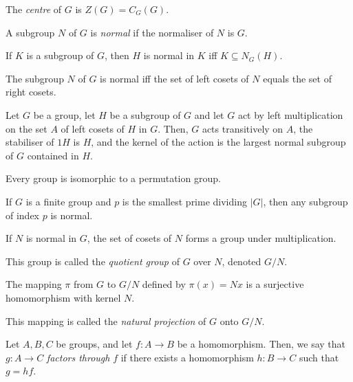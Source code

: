 \begin{defn}
    The \emph{centre} of $G$ is $Z(G)=C_G(G)$.
\end{defn}
\begin{defn}
    A subgroup $N$ of $G$ is \emph{normal} if the normaliser of $N$ is $G$.
\end{defn}
\begin{prop}
    If $K$ is a subgroup of $G$, then $H$ is normal in $K$ iff $K\subseteq
    N_G(H)$.
\end{prop}
\begin{prop}
    The subgroup $N$ of $G$ is normal iff the set of left cosets of $N$ equals
    the set of right cosets.
\end{prop}
\begin{prop}
    Let $G$ be a group, let $H$ be a subgroup of $G$ and let $G$ act by left
    multiplication on the set $A$ of left cosets of $H$ in $G$. Then, $G$ acts
    transitively on $A$, the stabiliser of $1H$ is $H$, and the kernel of the
    action is the largest normal subgroup of $G$ contained in $H$.
\end{prop}
\begin{cor}[Cayley]
    Every group is isomorphic to a permutation group.
\end{cor}
\begin{prop}
    If $G$ is a finite group and $p$ is the smallest prime dividing $|G|$, then
    any subgroup of index $p$ is normal.
\end{prop}
\begin{prop}
    If $N$ is normal in $G$, the set of cosets of $N$ forms a group under
    multiplication.
\end{prop}
\begin{defn}
    This group is called the \emph{quotient group} of $G$ over $N$, denoted
    $G/N$.
\end{defn}
\begin{prop}
    The mapping $\pi$ from $G$ to $G/N$ defined by $\pi(x)=Nx$ is a
    surjective homomorphism with kernel $N$.
\end{prop}
\begin{defn}
    This mapping is called the \emph{natural projection} of $G$ onto $G/N$.
\end{defn}
\begin{defn}
    Let $A,B,C$ be groups, and let $f:A\to B$ be a homomorphism. Then, we say
    that $g:A\to C$ \emph{factors through} $f$ if there exists a homomorphism
    $h:B\to C$ such that $g=hf$.
\end{defn}
